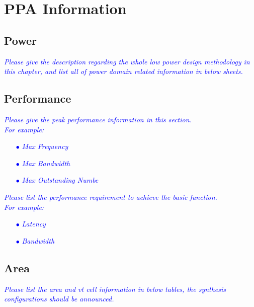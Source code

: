 
\clearpage

\section{PPA Information}
\subsection{Power}
\noindent\textit{\textcolor{blue}{Please give the description regarding the whole low power design methodology in this chapter, and list all of power domain related information in below sheets.}}

\subsection{Performance}
\noindent\textit{\textcolor{blue}{Please give the peak performance information in this section.\\
For example:}}
\begin{itemize}
    \item[\textcolor{blue}{$\bullet$}] \noindent\textit{\textcolor{blue}{Max Frequency}}
    \item[\textcolor{blue}{$\bullet$}] \noindent\textit{\textcolor{blue}{Max Bandwidth}}
    \item[\textcolor{blue}{$\bullet$}] \noindent\textit{\textcolor{blue}{Max Outstanding Numbe}} \\
\end{itemize}

\noindent\textit{\textcolor{blue}{Please list the performance requirement to achieve the basic function.\\
For example:}}

\begin{itemize}
    \item[\textcolor{blue}{$\bullet$}] \noindent\textit{\textcolor{blue}{Latency}}
    \item[\textcolor{blue}{$\bullet$}] \noindent\textit{\textcolor{blue}{Bandwidth}}
\end{itemize}

\subsection{Area}
\noindent\textit{\textcolor{blue}{Please list the area and vt cell information in below tables, the synthesis configurations should be announced.}}

